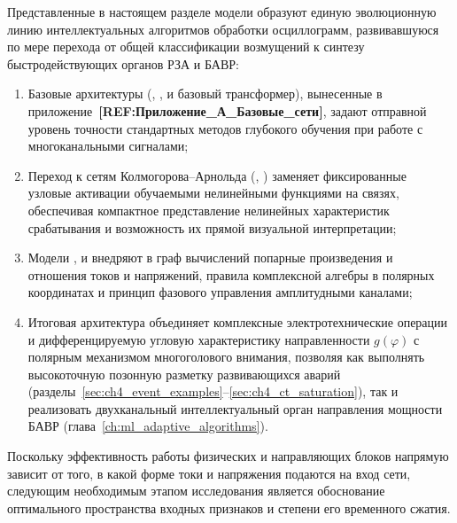 Представленные в настоящем разделе модели образуют единую эволюционную
линию интеллектуальных алгоритмов обработки осциллограмм, развивавшуюся
по мере перехода от общей классификации возмущений к синтезу
быстродействующих органов РЗА и БАВР:
\begin{enumerate}
    \item Базовые архитектуры (, ,
     и базовый трансформер), вынесенные в
    приложение~\textbf{[REF:Приложение\_А\_Базовые\_сети]}, задают
    отправной уровень точности стандартных методов глубокого обучения при
    работе с многоканальными сигналами;
    \item Переход к сетям Колмогорова--Арнольда (,
    ) заменяет фиксированные узловые активации обучаемыми
    нелинейными функциями на связях, обеспечивая компактное представление
    нелинейных характеристик срабатывания и возможность их прямой
    визуальной интерпретации;
    \item Модели ,  и 
    внедряют в граф вычислений попарные произведения и отношения токов и
    напряжений, правила комплексной алгебры в полярных координатах и
    принцип фазового управления амплитудными каналами;
    \item Итоговая архитектура  объединяет
    комплексные электротехнические операции и дифференцируемую угловую
    характеристику направленности $g(\varphi)$ с полярным механизмом
    многоголового внимания, позволяя как выполнять высокоточную позонную
    разметку развивающихся аварий (разделы~\ref{sec:ch4_event_examples}--\ref{sec:ch4_ct_saturation}),
    так и реализовать двухканальный интеллектуальный орган направления
    мощности БАВР (глава~\ref{ch:ml_adaptive_algorithms}).
\end{enumerate}

Поскольку эффективность работы физических и направляющих блоков напрямую
зависит от того, в какой форме токи и напряжения подаются на вход сети,
следующим необходимым этапом исследования является обоснование
оптимального пространства входных признаков и степени его временного
сжатия.























